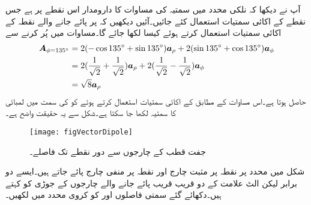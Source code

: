آپ نے دیکھا کہ نلکی محدد میں سمتیہ کی مساوات کا دارومدار اس نقطے پر ہے جس نقطے کے اکائی سمتیات استعمال کئے جائیں۔آئیں دیکھیں کہ  پر پائے جانے والے  نقطہ  کے اکائی سمتیات استعمال کرتے ہوئے  کیسا لکھا جائے گا۔مساوات  میں  پُر کرنے سے
\begin{align*}
{\ensuremath{{\boldsymbol{A}}}}_{\phi=135^\circ}&=2(- \cos 135^\circ + \sin 135^\circ) {\boldsymbol{a}}_{\rho} +2( \sin 135^\circ + \cos 135^\circ){\boldsymbol{a}}_{\phi}\\
&=2(\frac{1}{\sqrt{2}}+\frac{1}{\sqrt{2}}){\boldsymbol{a}}_{\rho}+2(\frac{1}{\sqrt{2}}-\frac{1}{\sqrt{2}}){\boldsymbol{a}}_{\phi}\\
&=\sqrt{8}{\boldsymbol{a}}_{\rho}
\end{align*}
حاصل ہوتا ہے۔اس مساوات کے مطابق  کے اکائی سمتیات استعمال کرتے ہوئے  کو  کی سمت میں  لمبائی کا سمتیہ لکھا جا سکتا ہے۔شکل سے یہ حقیقت واضح ہے۔ 

\begin{figure}
\centering
\texttt{[image: figVectorDipole]}
\caption{جفت قطب کے چارجوں سے دور نقطے تک فاصلے۔}
\label{شکل_سمتیہ_جفت_قطب}
\end{figure}
شکل  میں  محدد پر نقطہ  پر مثبت چارج  اور نقطہ  پر منفی چارج  پائے جاتے ہیں۔ایسے دو برابر لیکن الٹ علامت کے دو قریب قریب پائے جانے والے چارجوں کے جوڑی کو  کہتے ہیں۔دکھائے گئے سمتی فاصلوں  اور  کو کروی محدد میں لکھیں۔ 

